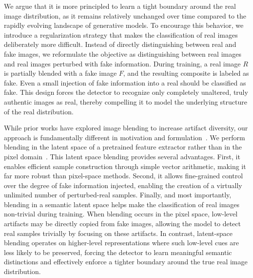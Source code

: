 We argue that it is more principled to learn a tight boundary around the real image distribution, as it remains relatively unchanged over time compared to the rapidly evolving landscape of generative models. To encourage this behavior, we introduce a regularization strategy that makes the classification of real images deliberately more difficult. Instead of directly distinguishing between real and fake images, we reformulate the objective as distinguishing between real images and real images perturbed with fake information. During training, a real image $R$ is partially blended with a fake image $F$, and the resulting composite is labeled as fake. Even a small injection of fake information into a real should be classified as fake. This design forces the detector to recognize only completely unaltered, truly authentic images as real, thereby compelling it to model the underlying structure of the real distribution.


While prior works have explored image blending to increase artifact diversity, our approach is fundamentally different in motivation and formulation~\cite{Shiohara_2022_CVPR, verma2019manifold}. We perform blending in the latent space of a pretrained feature extractor rather than in the pixel domain~\cite{zhang2018mixup}. This latent space blending provides several advantages. First, it enables efficient sample construction through simple vector arithmetic, making it far more robust than pixel-space methods. Second, it allows fine-grained control over the degree of fake information injected, enabling the creation of a virtually unlimited number of perturbed-real samples. Finally, and most importantly, blending in a semantic latent space helps make the classification of real images non-trivial during training. When blending occurs in the pixel space, low-level artifacts may be directly copied from fake images, allowing the model to detect real samples trivially by focusing on these artifacts. In contrast, latent-space blending operates on higher-level representations where such low-level cues are less likely to be preserved, forcing the detector to learn meaningful semantic distinctions and effectively enforce a tighter boundary around the true real image distribution.

